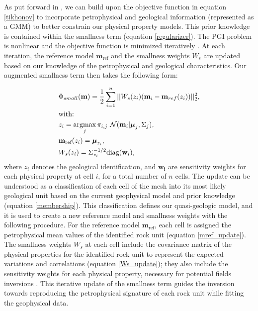 \documentclass[paper, twocolumn]{geophysics} %
\newcommand{\mitbf}[1]{
  \hbox{\mathversion{bold}$#1$}}
\begin{document}
As put forward in \citet{ggz389}, we can build upon the objective function in equation \ref{tikhonov} to incorporate petrophysical and geological information (represented as a GMM) to better constrain our physical property models. This prior knowledge is contained within the smallness term (equation \ref{regularizer}). The PGI problem is nonlinear and the objective function is minimized iteratively \citep{Tutorial}. At each iteration, the reference model $\mathbf{m}_{\text{ref}}$ and the smallness weights $W_{s}$ are updated based on our knowledge of the petrophysical and geological characteristics. Our augmented smallness term then takes the following form:

\begin{align}
&\Phi_{small}(\mathbf{m}) = \frac{1}{2}\sum_{i=1}^n||W_{s}(z_i)(\mathbf{m}_i-\mathbf{m}_{ref}(z_i))||_2^2, \label{smallness_petro}\\
&\text{with:}\nonumber\\
&z_i = \mathop{\hbox{argmax}}\limits_{j} \pi_{i,j}~\mathcal{N}(\mathbf{m}_i|\mitbf{\mu}_j, \Sigma_j), \label{membership} \\
&\mathbf{m}_{\text{ref}}(z_i) = \mitbf{\mu}_{z_i}, \label{mref_update}\\
&W_{s}(z_i) = \Sigma_{z_i}^{-1/2}\text{diag}(\mathbf{w}_{{i}}), \label{Ws_update}
\end{align}
where $z_i$ denotes the geological identification, and $\mathbf{w_i}$ are sensitivity weights for each physical property at cell $i$, for a total number of $n$ cells.
The update can be understood as a classification of each cell of the mesh into its most likely geological unit based on the current geophysical model and prior knowledge (equation \ref{membership}). This classification defines our quasi-geologic model, and it is used to create a new reference model and smallness weights with the following procedure. For the reference model $\mathbf{m}_{\text{ref}}$, each cell is assigned the petrophysical mean values of the identified rock unit (equation \ref{mref_update}). The smallness weights $W_{s}$ at each cell include the covariance matrix of the physical properties for the identified rock unit to represent the expected variations and correlations (equation \ref{Ws_update}); they also include the sensitivity weights for each physical property, necessary for potential fields inversions \citep{Li1996, Li1998, Li2001}. This iterative update of the smallness term guides the inversion towards reproducing the petrophysical signature of each rock unit while fitting the geophysical data.
\end{document}
